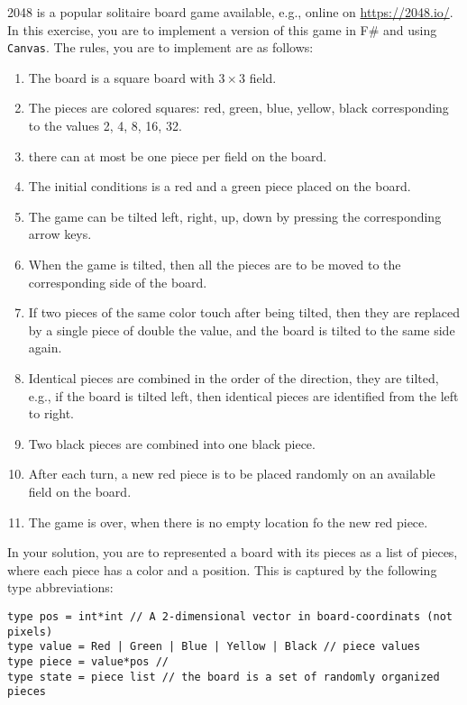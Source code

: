 2048 is a popular solitaire board game available, e.g., online on \url{https://2048.io/}. In this exercise, you are to implement a version of this game in F\# and using \lstinline{Canvas}. The rules, you are to implement are as follows:
\begin{enumerate}
\item The board is a square board with $3\times 3$ field.
\item The pieces are colored squares: red, green, blue, yellow, black corresponding to the values 2, 4, 8, 16, 32.
\item there can at most be one piece per field on the board.
\item The initial conditions is a red and a green piece placed on the board.
\item The game can be tilted left, right, up, down by pressing the corresponding arrow keys.
\item When the game is tilted, then all the pieces are to be moved to the corresponding side of the board.
\item If two pieces of the same color touch after being tilted, then they are replaced by a single piece of double the value, and the board is tilted to the same side again.
\item Identical pieces are combined in the order of the direction, they are tilted, e.g., if the board is tilted left, then identical pieces are identified from the left to right.
\item Two black pieces are combined into one black piece.
\item After each turn, a new red piece is to be placed randomly on an available field on the board.
\item The game is over, when there is no empty location fo the new red piece.
\end{enumerate}
In your solution, you are to represented a board with its pieces as a list of pieces, where each piece has a color and a position. This is captured by the following type abbreviations:
\begin{lstlisting}
type pos = int*int // A 2-dimensional vector in board-coordinats (not pixels)
type value = Red | Green | Blue | Yellow | Black // piece values
type piece = value*pos //
type state = piece list // the board is a set of randomly organized pieces
\end{lstlisting}

